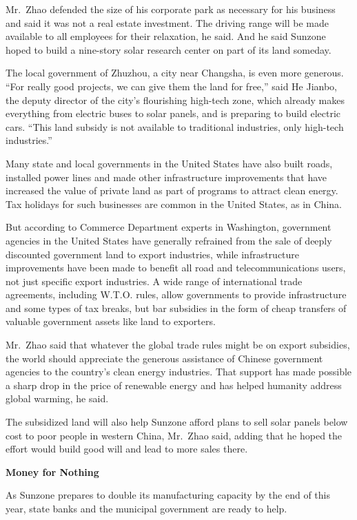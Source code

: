 ﻿\documentclass[12pt]{article}
\begin{document}
Mr.~Zhao defended the size of his corporate park as necessary for his business and said it was not a
real estate investment. The driving range will be made available to all employees for their
relaxation, he said. And he said Sunzone hoped to build a nine-story solar research center on part
of its land someday.

The local government of Zhuzhou, a city near Changsha, is even more generous. ``For really good
projects, we can give them the land for free,'' said He Jianbo, the deputy director of the city's
flourishing high-tech zone, which already makes everything from electric buses to solar panels, and
is preparing to build electric cars. ``This land subsidy is not available to traditional industries,
only high-tech industries.''

Many state and local governments in the United States have also built roads, installed power lines
and made other infrastructure improvements that have increased the value of private land as part of
programs to attract clean energy. Tax holidays for such businesses are common in the United States,
as in China.

But according to Commerce Department experts in Washington, government agencies in the United States
have generally refrained from the sale of deeply discounted government land to export industries,
while infrastructure improvements have been made to benefit all road and telecommunications users,
not just specific export industries. A wide range of international trade agreements, including
W.T.O. rules, allow governments to provide infrastructure and some types of tax breaks, but bar
subsidies in the form of cheap transfers of valuable government assets like land to exporters.

Mr.~Zhao said that whatever the global trade rules might be on export subsidies, the world should
appreciate the generous assistance of Chinese government agencies to the country's clean energy
industries. That support has made possible a sharp drop in the price of renewable energy and has
helped humanity address global warming, he said.

The subsidized land will also help Sunzone afford plans to sell solar panels below cost to poor
people in western China, Mr.~Zhao said, adding that he hoped the effort would build good will and
lead to more sales there.

\textbf{Money for Nothing}

As Sunzone prepares to double its manufacturing capacity by the end of this year, state banks and
the municipal government are ready to help.
\end{document}
